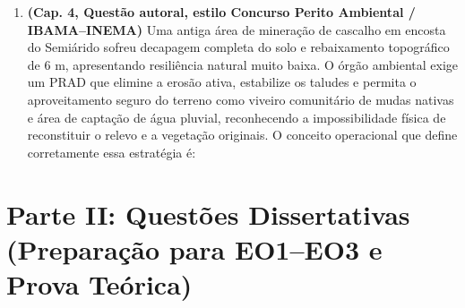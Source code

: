 \begin{enumerate}[leftmargin=1.8em, itemsep=6pt]
  \item \textbf{(Cap. 4, Questão autoral, estilo Concurso Perito Ambiental / IBAMA--INEMA)} Uma antiga área de mineração de cascalho em encosta do Semiárido sofreu decapagem completa do solo e rebaixamento topográfico de $6\text{ m}$, apresentando resiliência natural muito baixa. O órgão ambiental exige um PRAD que elimine a erosão ativa, estabilize os taludes e permita o aproveitamento seguro do terreno como viveiro comunitário de mudas nativas e área de captação de água pluvial, reconhecendo a impossibilidade física de reconstituir o relevo e a vegetação originais. O conceito operacional que define corretamente essa estratégia é:
  \espacoResolucao[1.2cm]

\end{enumerate}

\section*{Parte II: Questões Dissertativas (Preparação para EO1--EO3 e Prova Teórica)}

